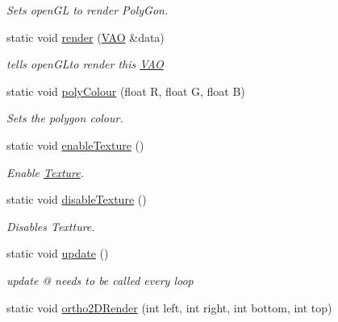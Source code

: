\begin{DoxyCompactItemize}
\begin{DoxyCompactList}\small\item\em Sets open\-G\-L to render Poly\-Gon. \end{DoxyCompactList}\item 
static void \hyperlink{class_o_p_e_n_g_l___facade_a44a1e4e5a6fd1b9e2e1b9d4ad5282c41}{render} (\hyperlink{class_v_a_o}{V\-A\-O} \&data)
\begin{DoxyCompactList}\small\item\em tells open\-G\-Lto render this \hyperlink{class_v_a_o}{V\-A\-O} \end{DoxyCompactList}\item 
static void \hyperlink{class_o_p_e_n_g_l___facade_a5227d49c3b085804fa7f250228173edd}{poly\-Colour} (float R, float G, float B)
\begin{DoxyCompactList}\small\item\em Sets the polygon colour. \end{DoxyCompactList}\item 
static void \hyperlink{class_o_p_e_n_g_l___facade_a0011ef0d8cf1d7aaa3f97d4a41bef573}{enable\-Texture} ()
\begin{DoxyCompactList}\small\item\em Enable \hyperlink{class_texture}{Texture}. \end{DoxyCompactList}\item 
static void \hyperlink{class_o_p_e_n_g_l___facade_a1d0cbb7151529bbce1b3a913c06c56dd}{disable\-Texture} ()
\begin{DoxyCompactList}\small\item\em Disables Textture. \end{DoxyCompactList}\item 
\hypertarget{class_o_p_e_n_g_l___facade_a7e93477364c2935010a6b4387be3b02b}{static void \hyperlink{class_o_p_e_n_g_l___facade_a7e93477364c2935010a6b4387be3b02b}{update} ()}\label{class_o_p_e_n_g_l___facade_a7e93477364c2935010a6b4387be3b02b}

\begin{DoxyCompactList}\small\item\em update @ needs to be called every loop \end{DoxyCompactList}\item 
\hypertarget{class_o_p_e_n_g_l___facade_a46a51f910f6290454758741f8b8af468}{static void \hyperlink{class_o_p_e_n_g_l___facade_a46a51f910f6290454758741f8b8af468}{ortho2\-D\-Render} (int left, int right, int bottom, int top)}\label{class_o_p_e_n_g_l___facade_a46a51f910f6290454758741f8b8af468}


\end{DoxyCompactItemize}
